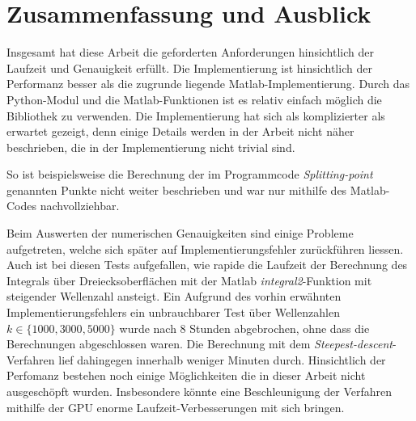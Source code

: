 \chapter{Zusammenfassung und Ausblick}

Insgesamt hat diese Arbeit die geforderten Anforderungen hinsichtlich der Laufzeit und Genauigkeit erfüllt. Die Implementierung ist hinsichtlich der Performanz besser als die zugrunde liegende Matlab-Implementierung.
Durch das Python-Modul und die Matlab-Funktionen ist es relativ einfach möglich die Bibliothek zu verwenden. 
Die Implementierung hat sich als komplizierter als erwartet gezeigt, denn einige Details werden in der Arbeit \cite{gasperini:hal-03209144} nicht näher beschrieben, die in der Implementierung nicht trivial sind.

So ist beispielsweise die Berechnung der im Programmcode \textit{Splitting-point} genannten Punkte nicht weiter beschrieben und war nur mithilfe des Matlab-Codes nachvollziehbar.

Beim Auswerten der numerischen Genauigkeiten sind einige Probleme aufgetreten, welche sich später auf Implementierungsfehler zurückführen liessen. Auch ist bei diesen Tests aufgefallen,
wie rapide die Laufzeit der Berechnung des Integrals über Dreiecksoberflächen mit der Matlab \textit{integral2}-Funktion mit steigender Wellenzahl ansteigt.
Ein Aufgrund des vorhin erwähnten Implementierungsfehlers ein unbrauchbarer Test über Wellenzahlen $k \in \{1000, 3000, 5000\}$ wurde nach 8 Stunden abgebrochen, ohne dass die Berechnungen abgeschlossen waren.
Die Berechnung mit dem \textit{Steepest-descent}-Verfahren lief dahingegen innerhalb weniger Minuten durch.
Hinsichtlich der Perfomanz bestehen noch einige Möglichkeiten die in dieser Arbeit nicht ausgeschöpft wurden. Insbesondere könnte eine Beschleunigung der Verfahren mithilfe der GPU enorme Laufzeit-Verbesserungen mit sich bringen.





